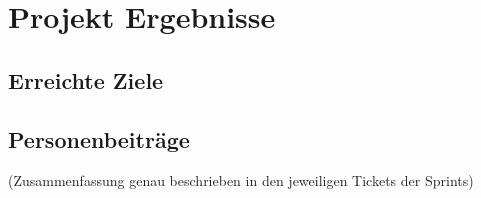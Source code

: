 
\chapter{Projekt Ergebnisse}

\section{Erreichte Ziele}

\section{Personenbeiträge}
(Zusammenfassung genau beschrieben in den jeweiligen Tickets der Sprints)